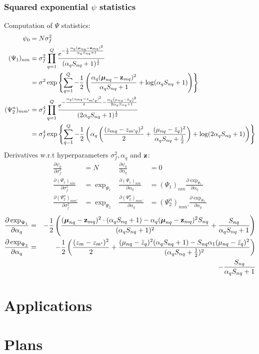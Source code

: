 \documentclass[11pt, a4paper]{article}
\begin{document}
\subsubsection{Squared exponential $\psi$ statistics}
\label{sec:SEpsi}
Computation of $\Psi$ statistics:
\begin{align*}
  \label{eq:psi_se}
  \psi_0 & = N\sigma_f^2\\
  (\Psi_1)_{nm} & = \sigma^2_f \prod_{q=1}^Q
  \frac{ e^{ - \frac{1}{2} \frac{ \alpha_q ({\boldsymbol{\mu}}_{nq}  -
        {\bf z}_{mq})^2}{\alpha_q S_{nq} + 1}}}
  {( \alpha_q S_{nq} + 1)^{\frac{1}{2}}} \\
  & = \sigma^2 \exp\left\{
    \sum_{q=1}^Q-\frac12 
    \left( \frac{\alpha_q({\boldsymbol{\mu}}_{nq} - {\bf z}_{mq})^2} {\alpha_qS_{nq}+1} 
      + \log(\alpha_qS_{nq}+1)
    \right)
  \right\}\\
  (\Psi^n_2)_{m m'} & = \sigma_f^4 
  \prod_{q=1}^Q \frac{ e^{-  \frac{\alpha_q (z_{mq} -
        z_{m'q})^2}{4} - \frac{\alpha_q \left(\mu_{nq} -
          \bar{z}_{q} \right)^2}{2 \alpha_q S_{nq} + 1}}}
  {(2 \alpha_q S_{nq} + 1)^{\frac{1}{2}}}\\
  & = \sigma_f^4\exp\left\{\sum_{q=1}^Q-\frac12\left(\alpha_q\left(\frac{(z_{mq}-z_{m'q})^2}2 + \frac{(\mu_{nq}-\bar z_q)^2}{\alpha_qS_{nq}+\frac12}\right) + \log(2\alpha_qS_{nq}+1)\right)\right\}
\end{align*}
Derivatives w.r.t hyperparameters $\sigma^2_f, \alpha_q$ and $\bf z$:
\begin{align*}
  \frac{\partial\psi_0}{\partial\sigma_f^2} & = N & \frac{\partial\psi_0}{\partial\alpha_q} & = 0\\
  \frac{\partial(\Psi_1)_{nm}}{\partial\sigma_f^2} & = \exp_{\Psi_1} 
  & \frac{\partial(\Psi_1)_{nm}}{\partial\alpha_q} & = (\Psi_1)_{nm}\frac{\partial\exp_{\Psi_1}}{\partial\alpha_q} \\
  \frac{\partial(\Psi_2^n)_{mm'}}{\partial\sigma_f^2} & = \exp_{\Psi_2} 
  & \frac{\partial(\Psi_2^n)_{mm'}}{\partial\alpha_q} & = (\Psi_2^n)_{mm'}\frac{\partial\exp_{\Psi_2}}{\partial\alpha_q} 
\end{align*}
\begin{align*}
    \frac{\partial\exp_{\Psi_1}}{\partial\alpha_q} & = & -\frac12\left(\frac{(\boldsymbol{\mu}_{nq} - {\bf z}_{mq})^2\cdot(\alpha_qS_{nq}+1)-\alpha_q(\boldsymbol{\mu}_{nq} - {\bf z}_{mq})^2S_{nq}}{(\alpha_qS_{nq}+1)^2} + \frac{S_{nq}}{\alpha_qS_{nq}+1} \right)\\
  \frac{\partial\exp_{\Psi_2}}{\partial\alpha_q} & = & -\frac12\left(\frac{(z_m-z_{m'})^2}2 + \frac{(\mu_{nq} - \bar z_q)^2(\alpha_qS_{nq}+1) - S_{nq}\alpha_1(\mu_{nq} - \bar z_q)^2}{(\alpha_qS_{nq}+\frac12)^2}\right)\\
  & & - \frac{S_{nq}}{\alpha_qS_{nq}+1}
\end{align*}
\section{Applications}
\label{sec:applications}


\section{Plans}
\label{sec:plans}





\end{document}

